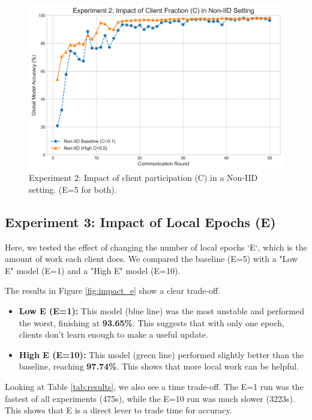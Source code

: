 \documentclass[conference]{IEEEtran}
\begin{document}
\begin{figure}[htbp]
  \centering
  \includegraphics[width=0.9\linewidth]{fig_2_impact_of_C.png}
  \caption{Experiment 2: Impact of client participation (C) in a Non-IID setting. (E=5 for both).}
  \label{fig:impact_c}
\end{figure}

\subsection{Experiment 3: Impact of Local Epochs (E)}
Here, we tested the effect of changing the number of local epochs `E`, which is the amount of work each client does. We compared the baseline (E=5) with a "Low E" model (E=1) and a "High E" model (E=10).

The results in Figure \ref{fig:impact_e} show a clear trade-off.
\begin{itemize}
    \item \textbf{Low E (E=1):} This model (blue line) was the most unstable and performed the worst, finishing at \textbf{93.65\%}. This suggests that with only one epoch, clients don't learn enough to make a useful update.
    \item \textbf{High E (E=10):} This model (green line) performed slightly better than the baseline, reaching \textbf{97.74\%}. This shows that more local work can be helpful.
\end{itemize}
Looking at Table \ref{tab:results}, we also see a time trade-off. The E=1 run was the fastest of all experiments (475s), while the E=10 run was much slower (3223s). This shows that E is a direct lever to trade time for accuracy.
\end{document}
